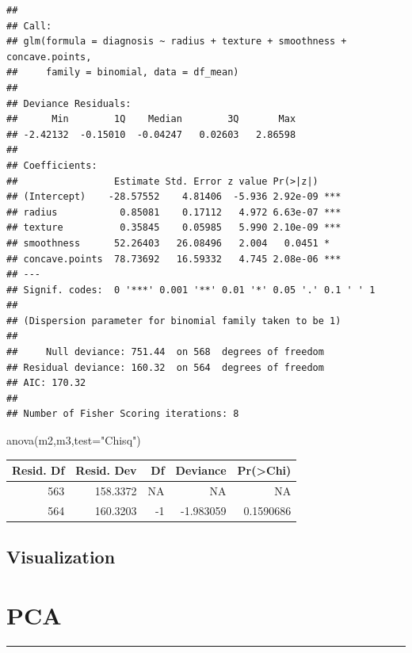 \documentclass[
  11pt,
]{article}
\newenvironment{Shaded}{\begin{snugshade}}{\end{snugshade}}
\newcommand{\AttributeTok}[1]{\textcolor[rgb]{0.77,0.63,0.00}{#1}}
\newcommand{\FunctionTok}[1]{\textcolor[rgb]{0.00,0.00,0.00}{#1}}
\newcommand{\NormalTok}[1]{#1}
\newcommand{\StringTok}[1]{\textcolor[rgb]{0.31,0.60,0.02}{#1}}
\begin{document}
\begin{verbatim}
## 
## Call:
## glm(formula = diagnosis ~ radius + texture + smoothness + concave.points, 
##     family = binomial, data = df_mean)
## 
## Deviance Residuals: 
##      Min        1Q    Median        3Q       Max  
## -2.42132  -0.15010  -0.04247   0.02603   2.86598  
## 
## Coefficients:
##                 Estimate Std. Error z value Pr(>|z|)    
## (Intercept)    -28.57552    4.81406  -5.936 2.92e-09 ***
## radius           0.85081    0.17112   4.972 6.63e-07 ***
## texture          0.35845    0.05985   5.990 2.10e-09 ***
## smoothness      52.26403   26.08496   2.004   0.0451 *  
## concave.points  78.73692   16.59332   4.745 2.08e-06 ***
## ---
## Signif. codes:  0 '***' 0.001 '**' 0.01 '*' 0.05 '.' 0.1 ' ' 1
## 
## (Dispersion parameter for binomial family taken to be 1)
## 
##     Null deviance: 751.44  on 568  degrees of freedom
## Residual deviance: 160.32  on 564  degrees of freedom
## AIC: 170.32
## 
## Number of Fisher Scoring iterations: 8
\end{verbatim}

\begin{Shaded}
\begin{Highlighting}[]
\FunctionTok{anova}\NormalTok{(m2,m3,}\AttributeTok{test=}\StringTok{"Chisq"}\NormalTok{)}
\end{Highlighting}
\end{Shaded}

\begin{tabular}{r|r|r|r|r}
\hline
Resid. Df & Resid. Dev & Df & Deviance & Pr(>Chi)\\
\hline
563 & 158.3372 & NA & NA & NA\\
\hline
564 & 160.3203 & -1 & -1.983059 & 0.1590686\\
\hline
\end{tabular}

\hypertarget{visualization}{%
\subsection{Visualization}\label{visualization}}

\hypertarget{pca}{%
\section{PCA}\label{pca}}

\begin{center}\rule{0.5\linewidth}{0.5pt}\end{center}
\end{document}
